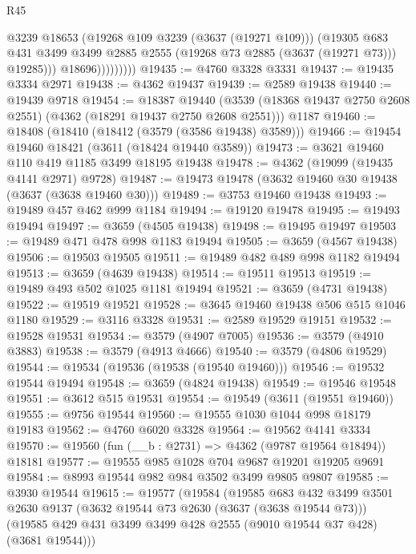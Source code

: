 \begin{lexlean}{R45}
\begin{coremodule}
                          @3239
                          @18653
                          (@19268 @109 @3239 (@3637 (@19271 @109)))
                          (@19305
                            @683
                            @431
                            @3499
                            @3499
                            @2885
                            @2555
                            (@19268 @73 @2885 (@3637 (@19271 @73)))
                            @19285)))
                      @18696)))))))))
@19435 := @4760 @3328 @3331
@19437 := @19435 @3334 @2971
@19438 := @4362 @19437
@19439 := @2589 @19438
@19440 := @19439 @9718
@19454 := @18387
    @19440
    (@3539 (@18368 @19437 @2750 @2608 @2551) (@4362 (@18291 @19437 @2750 @2608 @2551)))
    @1187
@19460 := @18408 (@18410 (@18412 (@3579 (@3586 @19438) @3589)))
@19466 := @19454 @19460 @18421 (@3611 (@18424 @19440 @3589))
@19473 := @3621 @19460 @110 @419 @1185 @3499 @18195 @19438
@19478 := @4362 (@19099 (@19435 @4141 @2971) @9728)
@19487 := @19473 @19478 (@3632 @19460 @30 @19438 (@3637 (@3638 @19460 @30)))
@19489 := @3753 @19460 @19438
@19493 := @19489 @457 @462 @999 @1184
@19494 := @19120 @19478
@19495 := @19493 @19494
@19497 := @3659 (@4505 @19438)
@19498 := @19495 @19497
@19503 := @19489 @471 @478 @998 @1183 @19494
@19505 := @3659 (@4567 @19438)
@19506 := @19503 @19505
@19511 := @19489 @482 @489 @998 @1182 @19494
@19513 := @3659 (@4639 @19438)
@19514 := @19511 @19513
@19519 := @19489 @493 @502 @1025 @1181 @19494
@19521 := @3659 (@4731 @19438)
@19522 := @19519 @19521
@19528 := @3645 @19460 @19438 @506 @515 @1046 @1180
@19529 := @3116 @3328
@19531 := @2589 @19529 @19151
@19532 := @19528 @19531
@19534 := @3579 (@4907 @7005)
@19536 := @3579 (@4910 @3883)
@19538 := @3579 (@4913 @4666)
@19540 := @3579 (@4806 @19529)
@19544 := @19534 (@19536 (@19538 (@19540 @19460)))
@19546 := @19532 @19544 @19494
@19548 := @3659 (@4824 @19438)
@19549 := @19546 @19548
@19551 := @3612 @515 @19531
@19554 := @19549 (@3611 (@19551 @19460))
@19555 := @9756 @19544
@19560 := @19555 @1030 @1044 @998 @18179 @19183
@19562 := @4760 @6020 @3328
@19564 := @19562 @4141 @3334
@19570 := @19560 (fun (__b : @2731) => @4362 (@9787 @19564 @18494)) @18181
@19577 := @19555 @985 @1028 @704 @9687 @19201 @19205 @9691
@19584 := @8993 @19544 @982 @984 @3502 @3499 @9805 @9807
@19585 := @3930 @19544
@19615 := @19577
    (@19584
      (@19585
        @683
        @432
        @3499
        @3501
        @2630
        @9137
        (@3632 @19544 @73 @2630 (@3637 (@3638 @19544 @73)))
        (@19585 @429 @431 @3499 @3499 @428 @2555 (@9010 @19544 @37 @428) (@3681 @19544)))

\end{coremodule}
\end{lexlean}
